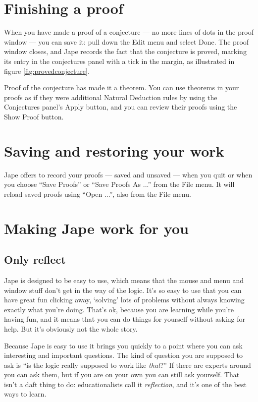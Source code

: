 \documentclass[11pt]{book}
\newcommand{\figref}[1]{figure \ref{fig:#1}}
\begin{document}
\section{Finishing a proof}

When you have made a proof of a conjecture --- no more lines of dots in the proof window --- you can save it: pull down the Edit menu and select Done. The proof window closes, and Jape records the fact that the conjecture is proved, marking its entry in the conjectures panel with a tick in the margin, as illustrated in \figref{provedconjecture}.

Proof of the conjecture has made it a theorem. You can use theorems in your proofs as if they were additional Natural Deduction rules by using the Conjectures panel's Apply button, and you can review 
their proofs using the Show Proof button.

\section{Saving and restoring your work}

Jape offers to record your proofs --- saved and unsaved --- when you quit or when you choose ``Save Proofs'' or ``Save Proofs As ...'' from the File menu. It will reload saved proofs using ``Open ...'', also from the File menu. 

\section{Making Jape work for you}

\subsection{Only reflect}

Jape is designed to be easy to use, which means that the mouse and menu and window stuff don't get in the way of the logic. It's so easy to use that you can have great fun clicking away, `solving' lots of problems without always knowing exactly what you're doing. That's ok, because you are learning while you're having fun, and it means that you can do things for yourself without asking for help. But it's obviously not the whole story.

Because Jape is easy to use it brings you quickly to a point where you can ask interesting and important questions. The kind of question you are supposed to ask is ``is the logic really supposed to work like \emph{that}?'' If there are experts around you can ask them, but if you are on your own you can still ask yourself. That isn't a daft thing to do: educationalists call it \emph{reflection}, and it's one of the best ways to learn.
\end{document}

